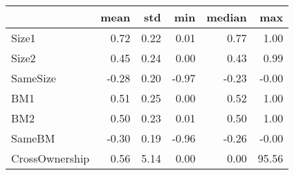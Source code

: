 \begin{tabular}{lrrrrr}
\toprule
{} &  mean &   std &   min &  median &    max \\
\midrule
Size1          &  0.72 &  0.22 &  0.01 &    0.77 &   1.00 \\
Size2          &  0.45 &  0.24 &  0.00 &    0.43 &   0.99 \\
SameSize       & -0.28 &  0.20 & -0.97 &   -0.23 &  -0.00 \\
BM1            &  0.51 &  0.25 &  0.00 &    0.52 &   1.00 \\
BM2            &  0.50 &  0.23 &  0.01 &    0.50 &   1.00 \\
SameBM         & -0.30 &  0.19 & -0.96 &   -0.26 &  -0.00 \\
CrossOwnership &  0.56 &  5.14 &  0.00 &    0.00 &  95.56 \\
\bottomrule
\end{tabular}
